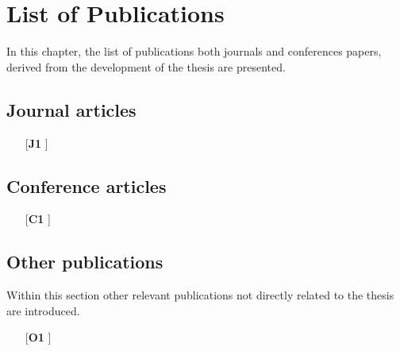 \chapter{List of Publications}

In this chapter, the list of publications both journals and conferences papers, derived from the development of the thesis are presented.
\section{Journal articles}
\begin{itemize}
\item[[\textbf{J1}]]
\end{itemize}
\section{Conference articles}
\begin{itemize}
\item[[\textbf{C1}]]
\end{itemize}

\section{Other publications}
Within this section other relevant publications not directly related to the thesis are introduced.
\begin{itemize}
\item[[\textbf{O1}]]
\end{itemize}
